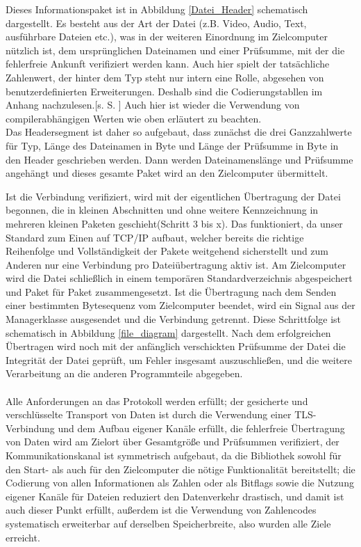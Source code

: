 Dieses Informationspaket ist in Abbildung \ref{Datei_Header} schematisch dargestellt.
Es besteht aus der Art der Datei (z.B. Video, Audio, Text, ausführbare Dateien etc.), was in der weiteren Einordnung im Zielcomputer nützlich ist, dem ursprünglichen Dateinamen und einer Prüfsumme, mit der die fehlerfreie Ankunft verifiziert werden kann. Auch hier spielt der tatsächliche Zahlenwert, der hinter dem Typ steht nur intern eine Rolle, abgesehen von benutzerdefinierten Erweiterungen. Deshalb sind die Codierungstabllen im Anhang nachzulesen.[s. S. \pageref{enums}]
Auch hier ist wieder die Verwendung von compilerabhängigen Werten wie oben erläutert zu beachten.\\
Das Headersegment ist daher so aufgebaut, dass zunächst die drei Ganzzahlwerte für Typ, Länge des Dateinamen in Byte und Länge der Prüfsumme in Byte in den Header geschrieben werden. Dann werden Dateinamenslänge und Prüfsumme angehängt und dieses gesamte Paket wird an den Zielcomputer übermittelt.\par
Ist die Verbindung verifiziert, wird mit der eigentlichen Übertragung der Datei begonnen, die in kleinen Abschnitten und ohne weitere Kennzeichnung in mehreren kleinen Paketen geschieht(Schritt 3 bis x).
Das funktioniert, da unser Standard zum Einen auf TCP/IP aufbaut, welcher bereits die richtige Reihenfolge und Vollständigkeit der Pakete weitgehend sicherstellt und zum Anderen nur eine Verbindung pro Dateiübertragung aktiv ist.
Am Zielcomputer wird die Datei schließlich in einem temporären Standardverzeichnis abgespeichert und Paket für Paket zusammengesetzt.
Ist die Übertragung nach dem Senden einer bestimmten Bytesequenz vom Zielcomputer beendet, wird ein Signal aus der Managerklasse ausgesendet und die Verbindung getrennt.
Diese Schrittfolge ist schematisch in Abbildung \ref{file_diagram} dargestellt.
Nach dem erfolgreichen Übertragen wird noch mit der anfänglich verschickten Prüfsumme der Datei die Integrität der Datei geprüft, um Fehler insgesamt auszuschließen, und die weitere Verarbeitung an die anderen Programmteile abgegeben.\\\\
Alle Anforderungen an das Protokoll werden erfüllt; der gesicherte und verschlüsselte Transport von Daten ist durch die Verwendung einer TLS-Verbindung und dem Aufbau eigener Kanäle erfüllt, die fehlerfreie Übertragung von Daten wird am Zielort über Gesamtgröße und Prüfsummen verifiziert, der Kommunikationskanal ist symmetrisch aufgebaut, da die Bibliothek sowohl für den Start- als auch für den Zielcomputer die nötige Funktionalität bereitstellt; die Codierung von allen Informationen als Zahlen oder als Bitflags sowie die Nutzung eigener Kanäle für Dateien reduziert den Datenverkehr drastisch, und damit ist auch dieser Punkt erfüllt, außerdem ist die Verwendung von Zahlencodes systematisch erweiterbar auf derselben Speicherbreite, also wurden alle Ziele erreicht.

